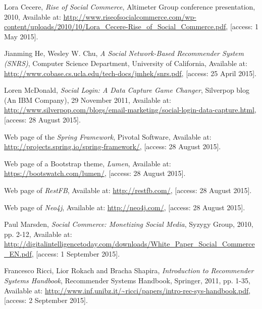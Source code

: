 \documentclass[12pt]{report}
\begin{document}

\begin{thebibliography}{99}

Lora Cecere, \textit{Rise of Social Commerce}, Altimeter Group conference presentation, 2010, Available at: \url{http://www.riseofsocialcommerce.com/wp-content/uploads/2010/10/Lora_Cecere-Rise_of_Social_Commerce.pdf}, [access: 1 May 2015].

Jianming He, Wesley W. Chu, \textit{A Social Network-Based Recommender System (SNRS)}, Computer Science Department, University of California, Available at: \url{http://www.cobase.cs.ucla.edu/tech-docs/jmhek/snrs.pdf}, [access: 25 April 2015].

Loren McDonald, \textit{Social Login: A Data Capture Game Changer}, Silverpop blog (An IBM Company), 29 November 2011, Available at: \url{http://www.silverpop.com/blogs/email-marketing/social-login-data-capture.html}, [access: 28 August 2015].

Web page of the \textit{Spring Framework}, Pivotal Software, Available at: \url{http://projects.spring.io/spring-framework/}, [access: 28 August 2015].

Web page of a Bootstrap theme, \textit{Lumen}, Available at: \url{https://bootswatch.com/lumen/}, [access: 28 August 2015].

Web page of \textit{RestFB}, Available at: \url{http://restfb.com/}, [access: 28 August 2015].

Web page of \textit{Neo4j}, Available at: \url{http://neo4j.com/}, [access: 28 August 2015].

Paul Marsden, \textit{Social Commerce: Monetizing Social Media}, Syzygy Group, 2010, pp. 2-12, Available at: \url{http://digitalintelligencetoday.com/downloads/White_Paper_Social_Commerce_EN.pdf}, [access: 1 September 2015].

Francesco Ricci, Lior Rokach and Bracha Shapira, \textit{Introduction to Recommender Systems Handbook}, Recommender Systems Handbook, Springer, 2011, pp. 1-35, Available at: \url{http://www.inf.unibz.it/~ricci/papers/intro-rec-sys-handbook.pdf}, [access: 2 September 2015].


\end{thebibliography}
\end{document}
